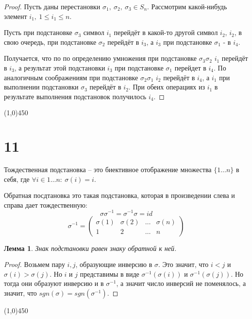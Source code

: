 \documentclass[a4paper,12pt]{article}
\newtheorem*{lem}{Лемма}
\begin{document}
	\begin{proof}
		Пусть даны перестановки $\sigma_1,\ \sigma_2,\ \sigma_3 \in S_n$. Рассмотрим какой-нибудь \\элемент $i_1,\ 1 \leqslant i_1 \leqslant n$. 
		
		Пусть при подстановке $\sigma_3$ символ $i_1$ перейдёт в какой-то другой символ $i_2$, $i_2$, в свою очередь, при подстановке $\sigma_2$ перейдёт в $i_3$, а $i_3$ при подстановке $\sigma_1$ - в $i_4$. 
		
		Получается, что по по определению умножения при подстановке $\sigma_3 \sigma_2$ $i_1$ перейдёт в $i_3$, а результат этой подстановки $i_3$ при подстановке $\sigma_1$ перейдет в $i_4$. По аналогичным соображениям при подстановке $\sigma_2 \sigma_1$ $i_2$ перейдёт в $i_4$, а $i_1$ при выполнении подстановки $\sigma_3$ перейдёт в $i_2$. При обеих операциях из $i_1$ в результате выполнения подстановок получилось $i_4$.
		
		
	\end{proof}
	\begin{center}
	\line(1,0){450}
\end{center}
	
	
	\section*{11}
	Тождественная подстановка -- это биективное отображение множества $\{1 \ldots n\}$ в себя, где $\forall i \in {1\ldots n}: \  \sigma (i) = i$.
	
	Обратная посдтановка это такая подстановка, которая в произведении слева и справа дает тождественную:
	\[
	\sigma \sigma^{-1} = \sigma^{-1} \sigma = id
	\]
	\[
	\sigma^{-1} =
	\begin{pmatrix}
	\sigma(1) & \sigma(2) & \ldots & \sigma(n) \\
	1 & 2 & \ldots & n
	\end{pmatrix}
	\]
	\begin{lem}
		Знак подстановки равен знаку обратной к ней.
	\end{lem}
	
	\begin{proof}
		Возьмем пару $i, j$, образующие инверсию в $\sigma$. Это значит, что $i < j$ и $\sigma(i) > \sigma(j)$. Но $i$ и $j$ представимы в виде $\sigma^{-1}(\sigma(i))$ и $\sigma^{-1}(\sigma(j))$. Но тогда они образуют инверсию и в $\sigma^{-1}$, а значит число инверсий не поменялось, а значит, что $sgn(\sigma) = sgn(\sigma^{-1})$. 
	\end{proof}
	\begin{center}
		\line(1,0){450}
	\end{center}
\end{document}
